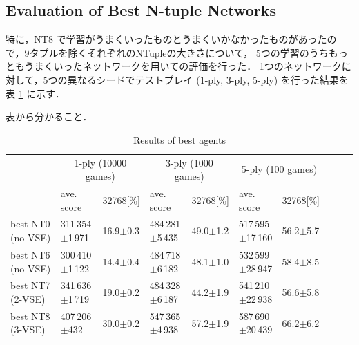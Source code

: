 \subsection{Evaluation of Best N-tuple Networks}

特に，NT8 で学習がうまくいったものとうまくいかなかったものがあったので，9タプルを除くそれぞれのNTupleの大きさについて，
5つの学習のうちもっともうまくいったネットワークを用いての評価を行った．
1つのネットワークに対して，5つの異なるシードでテストプレイ (1-ply, 3-ply, 5-ply) を行った結果を表 \ref{table:exp4} に示す．

表から分かること．


\begin{table}
 \caption{Results of best agents}
 \label{table:exp4}
 \small\begin{tabular}{l|l|l|l|l|l|l|l|l|l}
  \hline \hline
  & \multicolumn{2}{c}{1-ply (10000 games)} & \multicolumn{2}{c}{3-ply (1000 games)} & \multicolumn{2}{c}{5-ply (100 games)} \\
  & ave. score & 32768[\%] & ave. score & 32768[\%] & ave. score & 32768[\%] \\
  \hline
   best NT0 (no VSE)	& 311\,354$\pm$1\,971		& 16.9$\pm$0.3	& 484\,281$\pm$5\,435	& 49.0$\pm$1.2	& 517\,595$\pm$17\,160	& 56.2$\pm$5.7 \\\hline
   best NT6 (no VSE)	& 300\,410$\pm$1\,122		& 14.4$\pm$0.4	& 484\,718$\pm$6\,182	& 48.1$\pm$1.0	& 532\,599$\pm$28\,947	& 58.4$\pm$8.5 \\\hline
   best NT7 (2-VSE)	& 341\,636$\pm$1\,719		& 19.0$\pm$0.2	& 484\,328$\pm$6\,187	& 44.2$\pm$1.9	& 541\,210$\pm$22\,938	& 56.6$\pm$5.8 \\\hline
   best NT8 (3-VSE)	& 407\,206$\pm$\phantom{1\,}432 & 30.0$\pm$0.2	& 547\,365$\pm$4\,938	& 57.2$\pm$1.9	& 587\,690$\pm$20\,439	& 66.2$\pm$6.2 \\\hline
 \end{tabular}
\end{table}
